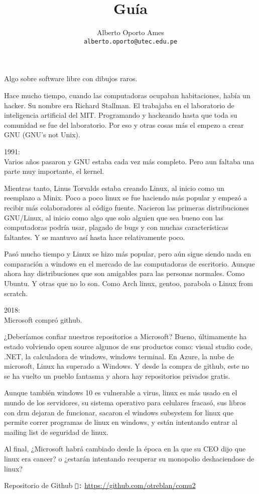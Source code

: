 \documentclass[12pt]{article}
\title{\textbf{Guía}}
\author{
		Alberto Oporto Ames\\
		\texttt{alberto.oporto@utec.edu.pe}
		}
\begin{document}
\maketitle
\thispagestyle{fancy}

Algo sobre software libre con dibujos raros.

Hace mucho tiempo, cuando las computadoras ocupaban habitaciones, había un hacker.
Su nombre era Richard Stallman.
El trabajaba en el laboratorio de inteligencia artificial del MIT.
Programando y hackeando hasta que toda su comunidad se fue del laboratorio.
Por eso y otras cosas más el empezo a crear GNU (GNU's not Unix).

1991:\\
Varios años pasaron y GNU estaba cada vez más completo.
Pero aun faltaba una parte muy importante, el kernel.

Mientras tanto, Linus Torvalds estaba creando Linux, al inicio como un reemplazo a Minix.
Poco a poco linux se fue haciendo más popular y empezó a recibir más colaboradores al código fuente.
Nacieron las primeras distribuciones GNU/Linux, al inicio como algo que solo alguien que sea bueno con las computadoras podría usar,
plagado de bugs y con muchas características faltantes.
Y se mantuvo así hasta hace relativamente poco.

Pasó mucho tiempo y Linux se hizo más popular,
pero aún sigue siendo nada en comparación a windows en el mercado de las computadoras de escritorio.
Aunque ahora hay distribuciones que son amigables para las personas normales.
Como Ubuntu.
Y otras que no lo son.
Como Arch linux, gentoo, parabola o Linux from scratch.

2018:\\
Microsoft compró github.

¿Deberíamos confiar nuestros repositorios a Microsoft?
Bueno, últimamente ha estado volviendo open source algunos de sus productos como: visual studio code, .NET, la calculadora de windows, windows terminal.
En Azure, la nube de microsoft, Linux ha superado a Windows.
Y desde la compra de github, este no se ha vuelto un pueblo fantasma y ahora hay repositorios privados gratis.

Aunque también windows 10 es vulnerable a virus,
linux es más usado en el mundo de los servidores,
su sistema operativo para celulares fracasó,
sus libros con drm dejaran de funcionar,
sacaron el windows subsystem for linux que permite correr programas de linux en windows,
y están intentando entrar al mailing list de seguridad de linux.

Al final, ¿Microsoft habrá cambiado desde la época en la que su CEO dijo que linux era cancer?
o ¿estarán intentando recuperar su monopolio deshaciendose de linux?

\vfill
Repositorio de Github \texttt{:} \url{https://github.com/otreblan/comu2}
\end{document}
